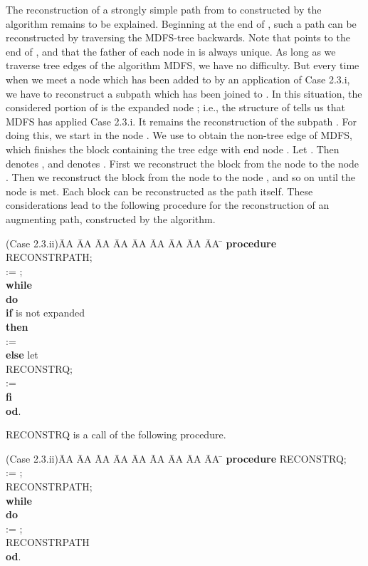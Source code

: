 \documentclass[12pt,twoside,a4paper]{article}
\begin{document}
\noindent
The reconstruction of a strongly simple path  from  to  constructed by
the algorithm remains to be explained. 
Beginning at the end of , such a path  can be reconstructed by traversing
the MDFS-tree  backwards. Note that  points to the end of ,
and that the father of each node in  is always unique.
As long as we traverse tree edges of the algorithm MDFS, we have no difficulty.
But every time when we meet a node  which has been added to  by an 
application of Case 2.3.i, we have to reconstruct a subpath  
which has been joined to . In this situation, the considered portion of 
is the expanded node ;
i.e., the structure of  tells us that MDFS has applied Case 2.3.i.
It remains the reconstruction of the subpath . For doing this, 
we start in the node . We use  to obtain the non-tree edge of MDFS, 
which finishes the block containing the tree edge with end node .
Let . Then  denotes , and
 denotes . First we reconstruct the block from the node
 to the node . Then we reconstruct the block from the node
 to the node , and so on until the node
 is met. Each block can be reconstructed as the path  itself.
These considerations lead to the following procedure for the reconstruction of
an augmenting path, constructed by the algorithm.
\begin{tabbing}
(Case 2.3.ii)\= AA \= AA \= AA \= AA \= AA \= AA \= AA \= AA \= AA \= \kill
\> {\bf procedure} RECONSTRPATH; \\
\>  := ; \\
\> {\bf while}  \\
\> {\bf do} \\ 
\> \> {\bf if}  is not expanded \\
\> \> {\bf then} \\
\> \> \>  :=  \\
\> \> {\bf else}  let  \\
\> \> \> RECONSTRQ; \\
\> \> \>  :=  \\
\> \> {\bf fi} \\
\> {\bf od}. \\
\end{tabbing}
\noindent
RECONSTRQ is a call of the following procedure.
\begin{tabbing}
(Case 2.3.ii)\= AA \= AA \= AA \= AA \= AA \= AA \= AA \= AA \= AA \= \kill
\> {\bf procedure} RECONSTRQ; \\
\>  := ; \\
\> RECONSTRPATH; \\ 
\> {\bf while}  \\
\> {\bf do} \\
\> \>  := ; \\
\> \> RECONSTRPATH  \\
\> {\bf od}. \\
\end{tabbing}
\end{document}
